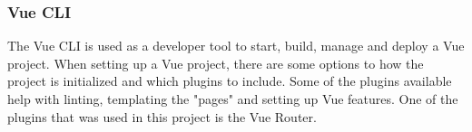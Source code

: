 \subsubsection{Vue CLI}
The Vue CLI\cite{VUECLI} is used as a developer tool to start, build, manage and deploy a Vue project. When setting up a Vue project, there are some options to how the project is initialized and which plugins to include. Some of the plugins available help with linting, templating the "pages" and setting up Vue features. One of the plugins that was used in this project is the Vue Router.